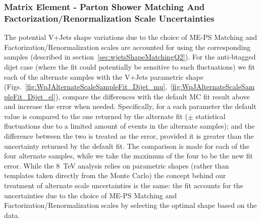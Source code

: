 \subsubsection{Matrix Element - Parton Shower Matching And Factorization/Renormalization Scale Uncertainties}
The potential V+Jets shape variations due to the choice of ME-PS Matching and Factorization/Renormalization scales are accounted for using the corresponding samples (described in section~\ref{sec:wjetsShapeMatchingQ2}). For the anti-btagged dijet case (where the fit could potentially be sensitive to such fluctuations) we fit each of the alternate samples with the V+Jets parametric shape (Figs.~\ref{fig:WpJAlternateScaleSampleFit_Dijet_mu},~\ref{fig:WpJAlternateScaleSampleFit_Dijet_el}), compare the differences with the default MC fit result above and increase the error when needed. Specifically, for a each parameter the default value is compared to the one returned by the alternate fit ($\pm$ statistical fluctuations due to a limited amount of events in the alternate samples); and the difference between the two is treated as the error, provided it is greater than the uncertainty returned by the default fit. The comparison is made for each of the four alternate samples, while we take the maximum of the four to be the new fit error. While the 8~TeV analysis relies on parametric shapes (rather than templates taken directly from the Monte Carlo) the concept behind our treatment of alternate scale uncertainties is the same: the fit accounts for the uncertainties due to the choice of ME-PS Matching and Factorization/Renormalization scales by selecting the optimal shape based on the data.


